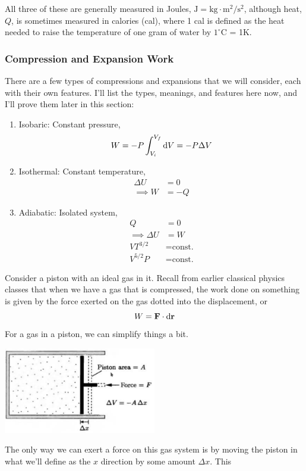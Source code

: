 \documentclass[a4paper]{article}
\begin{document}
All three of these are generally measured in Joules, \(\mathrm{J} = \mathrm{
kg\cdot m^2/s^2} \), although heat, $Q$, is sometimes measured in calories
(cal), where 1 cal is defined as the heat needed to raise the temperature of
one gram of water by $1^\circ$C = 1K.

\subsubsection{Compression and Expansion Work}
There are a few types of compressions and expansions that we will consider,
each with their own features. I'll list the types, meanings, and features here
now, and I'll prove them later in this section:
\begin{enumerate}
	\item Isobaric: Constant pressure,
		\[ W = -P\int_{V_i}^{V_f} \mathrm{d} V = -P\Delta V \]
	\item Isothermal: Constant temperature,
		\begin{align*}
			\Delta U &= 0\\
			\implies W &= -Q
		\end{align*}
	\item Adiabatic: Isolated system,
		\begin{align*}
			Q &= 0\\
			\implies \Delta U &= W\\
			VT^{3/2} &= \text{const.}\\
			V^{5/2}P &= \text{const.}
		\end{align*}
\end{enumerate}
Consider a piston with an ideal gas in it. Recall from earlier classical
physics classes that when we have a gas that is compressed, the work done on
something is given by the force exerted on the gas dotted into the
displacement, or
\[ W = \boldsymbol{\mathbf{F}} \cdot\mathrm{d}\boldsymbol{\mathbf{r}} \]
For a gas in a piston, we can simplify things a bit.
\begin{center}
	\includegraphics[width=0.5\textwidth]{Piston}
\end{center}
The only way we can exert a force on this gas system is by moving the piston
in what we'll define as the $x$ direction by some amount $\Delta x$. This
\end{document}
